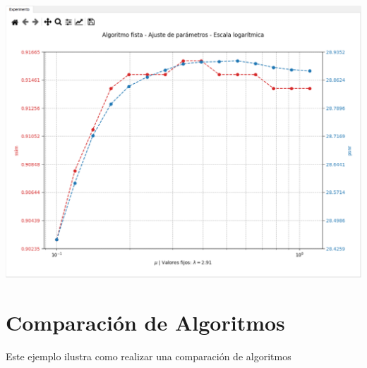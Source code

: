 \documentclass[12pt,twoside,letter]{ol-softwaremanual}
\newenvironment{Figure}
  {\par\medskip\noindent\minipage{\linewidth}}
  {\endminipage\par\medskip}
\begin{document}
\begin{enumerate}
	\begin{Figure}
	\centering
	\includegraphics[width=1\linewidth]{tuning-2.png}
	\label{fig:tuning_2}
	\end{Figure}

\end{enumerate}

\section{Comparación de Algoritmos}

Este ejemplo ilustra como realizar una comparación de algoritmos
\end{document}
